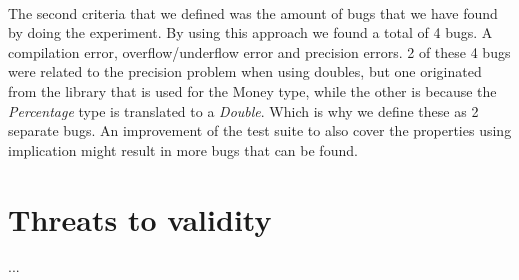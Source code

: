 \\
The second criteria that we defined was the amount of bugs that we have found by doing the experiment. By using this approach we found a total of 4 bugs. A compilation error, overflow/underflow error and precision errors. 2 of these 4 bugs were related to the precision problem when using doubles, but one originated from the library that is used for the Money type, while the other is because the \textit{Percentage} type is translated to a \textit{Double}. Which is why we define these as 2 separate bugs. An improvement of the test suite to also cover the properties using implication might result in more bugs that can be found.



\section{Threats to validity}
...
